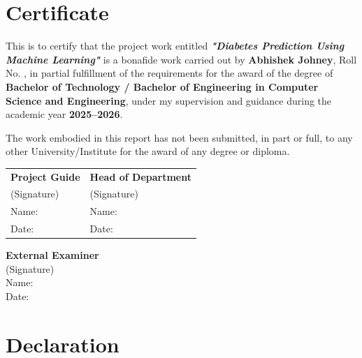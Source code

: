 \documentclass[12pt,a4paper]{report}
\begin{document}
\chapter*{Certificate}

This is to certify that the project work entitled \textbf{\textit{"Diabetes Prediction Using Machine Learning"}} is a bonafide work carried out by \textbf{Abhishek Johney}, Roll No. \underline{\hspace{2cm}}, in partial fulfillment of the requirements for the award of the degree of \textbf{Bachelor of Technology / Bachelor of Engineering in Computer Science and Engineering}, under my supervision and guidance during the academic year \textbf{2025--2026}.

The work embodied in this report has not been submitted, in part or full, to any other University/Institute for the award of any degree or diploma.

\vspace{2cm}

\begin{tabular}{p{} p{}}
\textbf{Project Guide} & \textbf{Head of Department} \\
(Signature) & (Signature) \\
Name: \underline{\hspace{4cm}} & Name: \underline{\hspace{4cm}} \\
Date: \underline{\hspace{3cm}} & Date: \underline{\hspace{3cm}} \\
\end{tabular}

\vspace{2cm}

\textbf{External Examiner}\\
(Signature)\\
Name: \underline{\hspace{5cm}}\\
Date: \underline{\hspace{3cm}}

\newpage

\chapter*{Declaration}
\end{document}
